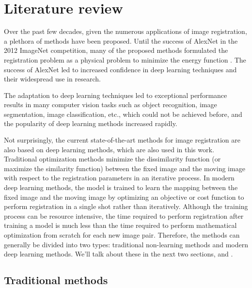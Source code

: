 \documentclass{report}
\begin{document}
	\chapter{Literature review}
	\label{chap:litreture}
	Over the past few decades, given the numerous applications of image registration, a plethora of methods have been proposed. Until the success of AlexNet \cite{AlexNet} in the 2012 ImageNet competition, many of the proposed methods formulated the registration problem as a physical problem to minimize the energy function \cite{THIRION1998243} \cite{536892} \cite{5193151} \cite{5338015} \cite{Avants2011ARE} \cite{1009381}. The success of AlexNet led to increased confidence in deep learning techniques and their widespread use in research.
	
	The adaptation to deep learning techniques led to exceptional performance results in many computer vision tasks such as object recognition, image segmentation, image classification, etc., which could not be achieved before, and the popularity of deep learning methods increased rapidly.
	
	Not surprisingly, the current state-of-the-art methods for image registration are also based on deep learning methods, which are also used in this work. Traditional optimization methods minimize the dissimilarity function (or maximize the similarity function) between the fixed image and the moving image with respect to the registration parameters in an iterative process. In modern deep learning methods, the model is trained to learn the mapping between the fixed image and the moving image by optimizing an objective or cost function to perform registration in a single shot rather than iteratively. Although the training process can be resource intensive, the time required to perform registration after training a model is much less than the time required to perform mathematical optimization from scratch for each new image pair. Therefore, the methods can generally be divided into two types: traditional non-learning methods and modern deep learning methods. We'll talk about these in the next two sections,  and .
	
	\section{Traditional methods}
	\label{section:traditional}
	
\end{document}
